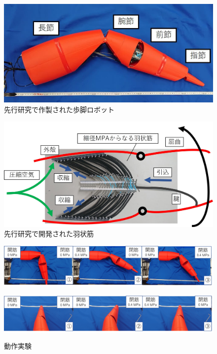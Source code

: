 \begin{figure}[t]
  \centering
  \includegraphics[scale=0.3]{image/robot_scale.JPG}
  \vspace{3mm}
  \caption{先行研究で作製された歩脚ロボット\cite{hasegawa}}
  \label{fig:senkoukenkyuu}
\end{figure}
\begin{figure}[t]
  \centering
  \vspace{3mm}
  \includegraphics[scale=0.14]{image/mosiki.JPG}
  \caption{先行研究で開発された羽状筋\cite{hasegawa}}
  \label{fig:ujyoukin}
\end{figure}
\begin{figure}[tbp]
  \begin{minipage}{1\hsize}
    \centering
    \includegraphics[scale=0.12]{image/move1all.png}
    \label{fig:move1}
  \end{minipage}
  \begin{minipage}{1\hsize}
    \centering
    \includegraphics[scale=0.12]{image/move2all.png}
    \label{fig:move2}
  \end{minipage}
%
  \caption{動作実験\cite{hasegawa}}
  \label{fig:movea12}
\end{figure}
%
